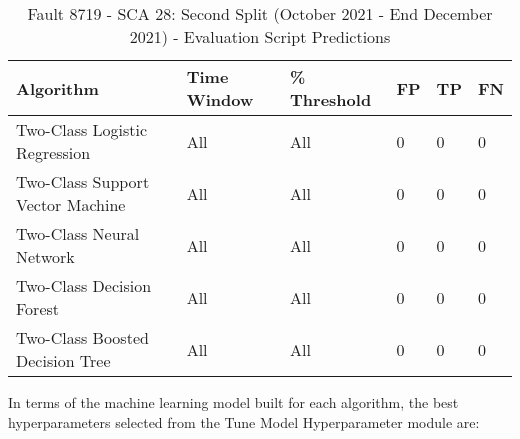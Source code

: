 \begin{table}[!ht]
    \centering
    \begin{tabular}{|l|l|l|l|l|l|}
    \hline
        Algorithm & Time Window & \% Threshold & FP & TP & FN \\ \hline
        Two-Class Logistic Regression & All & All & 0 & 0 & 0 \\ \hline
        Two-Class Support Vector Machine & All & All & 0 & 0 & 0 \\ \hline
        Two-Class Neural Network & All & All & 0 & 0 & 0 \\ \hline
        Two-Class Decision Forest & All & All & 0 & 0 & 0 \\ \hline
        Two-Class Boosted Decision Tree & All & All & 0 & 0 & 0 \\ \hline
    \end{tabular}
    \caption{Fault 8719 - SCA 28: Second Split (October 2021 - End December 2021) - Evaluation Script Predictions}
    \label{9112_SCA34_1st}
\end{table}

In terms of the machine learning model built for each algorithm, the best hyperparameters selected from the Tune Model Hyperparameter module are:


